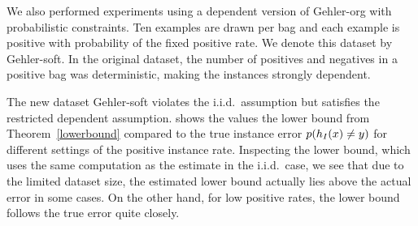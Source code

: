 We also performed experiments using a dependent version of Gehler-org
with probabilistic constraints. Ten examples are drawn per bag and each example is positive with probability
of the fixed positive rate. We denote this dataset by Gehler-soft. In the original dataset, the number of positives and negatives in a positive bag
was deterministic, making the instances strongly dependent.

The new dataset Gehler-soft violates the i.i.d.\ assumption but satisfies the
restricted dependent assumption. 
shows the values the lower bound from Theorem~\ref{lowerbound} compared to the
true instance error $p(h_I(x) \neq y)$ for different settings of the positive instance rate.
Inspecting the lower bound, which uses the same computation as the estimate in
the i.i.d.\ case, we see that due to the limited dataset size, the estimated
lower bound actually lies above the actual error in some cases. On the other
hand, for low positive rates, the lower bound follows the true error quite
closely.

